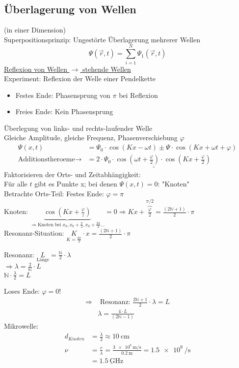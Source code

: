 \subsection{Überlagerung von Wellen} (in einer Dimension)\\
Superpositionsprinzip: Ungestörte Überlagerung mehrerer Wellen
$$ \Psi(\vec{r},t) = \sum_{i=1}^{N} \Psi_1(\vec{r},t)$$
\underline{Reflexion von Wellen $ \rightarrow $ stehende Wellen}\\
Experiment: Reflexion der Welle einer Pendelkette
\begin{itemize}
	\item Festes Ende: Phasensprung von $ \pi $ bei Reflexion
	\bild
	\item Freies Ende: Kein Phasensprung
	\bild
\end{itemize}
Überlegung von links- und rechts-laufender Welle\\
Gleiche Amplitude, gleiche Frequenz, Phasenverschiebung $ \varphi $
\begin{align*}
\Psi(x,t) &=\Psi_0 \cdot \cos(Kx-\omega t) \pm \Psi \cdot \cos(Kx+\omega t + \varphi)\\
\text{Additionstheroeme} \rightarrow &= \underline{\underline{2\cdot\Psi_0\cdot\cos(\omega t + \frac{\varphi}{2}) \cdot \cos(Kx+\frac{\varphi}{2})  } }
\end{align*}
Faktorisieren der Orts- und Zeitabhängigkeit:\\
Für alle $ t $ gibt es Punkte x; bei denen  $ \Psi(x,t) = 0 $: "Knoten"\\
Betrachte Orts-Teil: Festes Ende: $ \varphi = \pi $\\
Knoten: $ \underbrace{\cos(Kx+\frac{\varphi}{z})}_{\Rightarrow \text{Knoten bei } x_0, x_0+\frac{\pi}{2}, x_0+\frac{3\pi}{2}...} = 0 \Rightarrow Kx+\overbrace{\frac{\varphi}{2}}^{\pi/2}= \frac{(2\mathbb{N}+1)}{2} \cdot \pi $\\ \break
Resonanz-Situation: $  \underset{K=\frac{2\pi}{2}}{K} \cdot x = \frac{(2\mathbb{N}+1)}{2} \cdot \pi $\\
\begin{center}
	Resonanz: $ \underset{\text{Länge}}{L} = \frac{\mathbb{N}}{2} \cdot \lambda $\\
\underline{$ \Rightarrow \lambda = \frac{2}{\mathbb{N}}\cdot L $}\\
\underline{$ \mathbb{N}\cdot\frac{\lambda}{2} = L $}\\
\end{center}
 \bild
 Loses Ende: $ \varphi = 0 $!
 \begin{align*}
 \Rightarrow &\text{ Resonanz: } \frac{2\mathbb{N}+1}{2} \cdot \lambda = L\\
 &\lambda = \frac{4 \cdot L}{(2\mathbb{N}-1)}
 \end{align*}
 \bild
 Mikrowelle:
 \begin{align*}
 d_{Knoten} &= \frac{\lambda}{2} \approx \SI{10}{\centi\meter}\\
 \nu & = \frac{c}{\lambda} = \frac{\SI{3e8}{\meter\per\second}}{\SI{0,2}{\meter}} = \SI{1,5e9}{\per\second}\\
 &=\underline{\SI{1,5}{\giga\hertz}}
 \end{align*}
 \bild
 \bild
 
